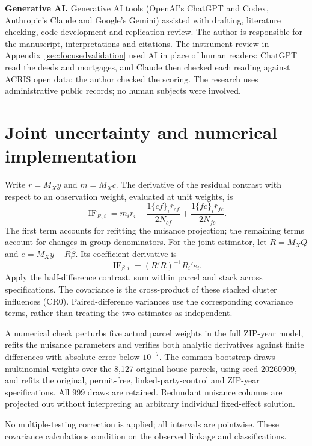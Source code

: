 \documentclass[12pt]{article}
\begin{document}
\noindent\textbf{Generative AI.} Generative AI tools (OpenAI's ChatGPT and Codex, Anthropic's Claude and Google's Gemini) assisted with drafting, literature checking, code development and replication review. The author is responsible for the manuscript, interpretations and citations. The instrument review in Appendix~\ref{sec:focusedvalidation} used AI in place of human readers: ChatGPT read the deeds and mortgages, and Claude then checked each reading against ACRIS open data; the author checked the scoring. The research uses administrative public records; no human subjects were involved.

\par\endgroup\clearpage\appendix
\section{Joint uncertainty and numerical implementation}
Write $r=M_Xy$ and $m=M_Xc$. The derivative of the residual contrast with respect to an observation weight, evaluated at unit weights, is
\begin{equation}
\operatorname{IF}_{R,i}=m_i r_i-\frac{1\{cf\}_i\bar r_{cf}}{2N_{cf}}+\frac{1\{fc\}_i\bar r_{fc}}{2N_{fc}}.
\end{equation}
The first term accounts for refitting the nuisance projection; the remaining terms account for changes in group denominators. For the joint estimator, let $R=M_XQ$ and $e=M_Xy-R\widehat\beta$. Its coefficient derivative is
\begin{equation}
\operatorname{IF}_{\beta,i}=(R'R)^{-1}R_i'e_i.
\end{equation}
Apply the half-difference contrast, sum within parcel and stack across specifications. The covariance is the cross-product of these stacked cluster influences (CR0). Paired-difference variances use the corresponding covariance terms, rather than treating the two estimates as independent.

A numerical check perturbs five actual parcel weights in the full ZIP-year model, refits the nuisance parameters and verifies both analytic derivatives against finite differences with absolute error below $10^{-7}$. The common bootstrap draws multinomial weights over the 8,127 original house parcels, using seed 20260909, and refits the original, permit-free, linked-party-control and ZIP-year specifications. All 999 draws are retained. Redundant nuisance columns are projected out without interpreting an arbitrary individual fixed-effect solution.

No multiple-testing correction is applied; all intervals are pointwise. These covariance calculations condition on the observed linkage and classifications.
\end{document}
